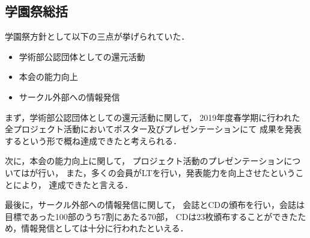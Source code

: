 \subsection*{学園祭総括}

学園祭方針として以下の三点が挙げられていた．

\begin{itemize}
    \item 学術部公認団体としての還元活動
    \item 本会の能力向上
    \item サークル外部への情報発信
\end{itemize}

まず，学術部公認団体としての還元活動に関して，
2019年度春学期に行われた全プロジェクト活動においてポスター及びプレゼンテーションにて
成果を発表するという形で概ね達成できたと考えられる．

次に，本会の能力向上に関して，
プロジェクト活動のプレゼンテーションについては\firstGrade{}が行い，
また，多くの会員がLTを行い，発表能力を向上させたということにより，
達成できたと言える．

最後に，サークル外部への情報発信に関して，
会誌とCDの頒布を行い，会誌は目標であった100部のうち7割にあたる70部，
CDは23枚頒布することができたため，情報発信としては十分に行われたといえる．
